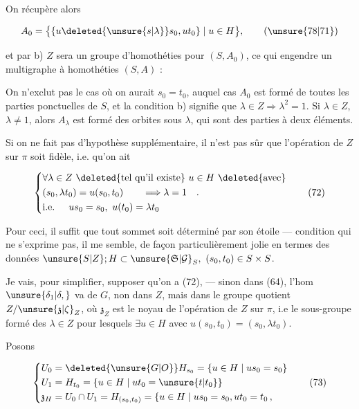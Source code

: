 On récupère alors 

\[
A_0=\bigl\{\{u\deleted{\unsure{s|\lambda}}s_0,ut_0\}\mid u\in H\bigr\},
\tag*{(\unsure{78|71})}
\]

et par b) $Z$ sera un groupe d'homothéties pour $(S,A_0)$, ce qui engendre un multigraphe à homothéties $(S,A)$ :

On n'exclut pas le cas où on aurait $s_0=t_0$, auquel cas $A_0$ est formé de toutes les parties ponctuelles de $S$, et la condition b) signifie que $\lambda\in Z\Longrightarrow\lambda^2=1$. Si $\lambda\in Z$, $\lambda\ne1$, alors $A_\lambda$ est formé des orbites sous $\lambda$, qui sont des parties à deux éléments. 

Si on ne fait pas d'hypothèse supplémentaire, il n'est pas sûr que l'opération de $Z$ sur $\pi$ soit fidèle, i.e. qu'on ait

\[
\left\{\begin{aligned}
&\forall\lambda\in Z\ \deleted{\text{tel qu'il existe}}\ u\in H\ \deleted{\text{avec}}\\
&(s_0,\lambda t_0)=u(s_0,t_0)\qquad\Longrightarrow\lambda=1\quad.\\
&\text{i.e. }\quad us_0=s_0,\ u(t_0)=\lambda t_0
\end{aligned}\right.
\tag*{(72)}
\]

Pour ceci, il suffit que tout sommet soit déterminé par son étoile --- condition qui ne s'exprime pas, il me semble, de façon particulièrement jolie en termes des données $\unsure{S|Z};H\subset\unsure{\mathfrak S|\mathcal G}_S,\ (s_0,t_0)\in S\times S$.

Je vais, pour simplifier, supposer qu'on a (72), --- sinon dans (64), l'hom $\unsure{\delta_1|\delta,}$ va de  $G$, non dans $Z$, mais dans le groupe quotient $Z/\unsure{\mathfrak z|\zeta}_Z$, où $\mathfrak z_Z$ est le noyau de l'opération de $Z$ sur $\pi$, i.e le sous-groupe formé des $\lambda\in Z$ pour lesquels $\exists u\in H$ avec $u(s_0,t_0)=(s_0,\lambda t_0)$.

Posons

\[
\left\{\begin{aligned}
U_0&=\deleted{\unsure{G|O}}H_{s_0}=\{u\in H\mid us_0=s_0\}\\
U_1&=H_{t_0}=\{u\in H\mid ut_0=\unsure{t|t_0}\}\\
\mathfrak z_H&=U_0\cap U_1=H_{(s_0,t_0)}=\{u\in H\mid us_0=s_0,ut_0=t_0\,,
\end{aligned}\right.
\tag*{(73)}
\]

